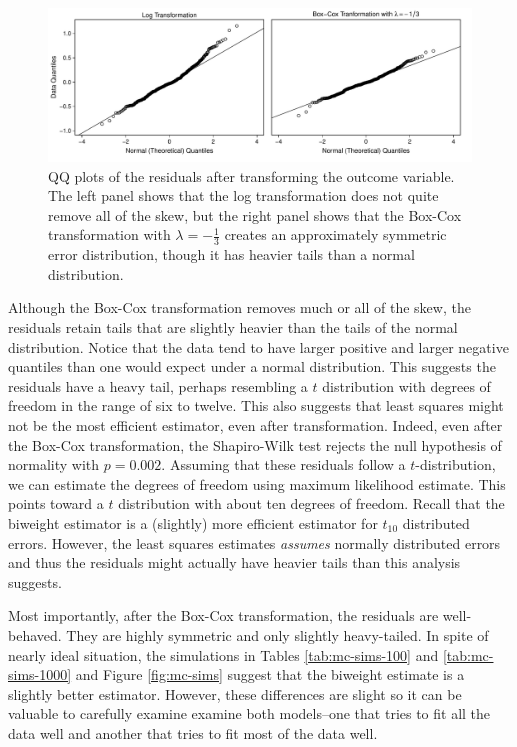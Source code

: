 \documentclass[12pt]{article}
\begin{document}
\begin{figure}[H]
\begin{center}
\includegraphics[width = \textwidth]{figs/cg-trans-qq-plot.pdf}
\caption{QQ plots of the residuals after transforming the outcome variable. The left panel shows that the log transformation does not quite remove all of the skew, but the right panel shows that the Box-Cox transformation with $\lambda = -\frac{1}{3}$ creates an approximately symmetric error distribution, though it has heavier tails than a normal distribution.}\label{fig:cg-trans-qq-plot}
\end{center}
\end{figure}

Although the Box-Cox transformation removes much or all of the skew, the residuals retain tails that are slightly heavier than the tails of the normal distribution. Notice that the data tend to have larger positive and larger negative quantiles than one would expect under a normal distribution. This suggests the residuals have a heavy tail, perhaps resembling a $t$ distribution with degrees of freedom in the range of six to twelve. This also suggests that least squares might not be the most efficient estimator, even after transformation. Indeed, even after the Box-Cox transformation, the Shapiro-Wilk test rejects the null hypothesis of normality with $p = 0.002$. Assuming that these residuals follow a $t$-distribution, we can estimate the degrees of freedom using maximum likelihood estimate. This points toward a $t$ distribution with about ten degrees of freedom. Recall that the biweight estimator is a (slightly) more efficient estimator for $t_{10}$ distributed errors. However, the least squares estimates \textit{assumes} normally distributed errors and thus the residuals might actually have heavier tails than this analysis suggests.

Most importantly, after the Box-Cox transformation, the residuals are well-behaved. They are highly symmetric and only slightly heavy-tailed. In spite of nearly ideal situation, the simulations in Tables \ref{tab:mc-sims-100} and \ref{tab:mc-sims-1000} and Figure \ref{fig:mc-sims} suggest that the biweight estimate is a slightly better estimator. However, these differences are slight so it can be valuable to carefully examine examine both models--one that tries to fit all the data well and another that tries to fit most of the data well.
\end{document}

